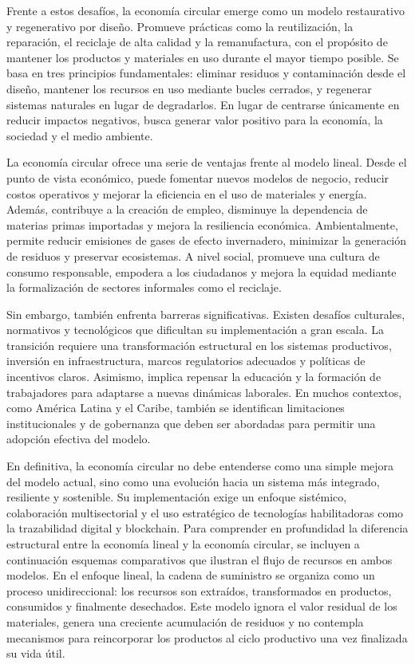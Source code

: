 Frente a estos desafíos, la economía circular emerge como un modelo restaurativo y regenerativo por diseño. Promueve prácticas como la reutilización, la reparación, el reciclaje de alta calidad y la remanufactura, con el propósito de mantener los productos y materiales en uso durante el mayor tiempo posible. Se basa en tres principios fundamentales: eliminar residuos y contaminación desde el diseño, mantener los recursos en uso mediante bucles cerrados, y regenerar sistemas naturales en lugar de degradarlos. En lugar de centrarse únicamente en reducir impactos negativos, busca generar valor positivo para la economía, la sociedad y el medio ambiente.

La economía circular ofrece una serie de ventajas frente al modelo lineal. Desde el punto de vista económico, puede fomentar nuevos modelos de negocio, reducir costos operativos y mejorar la eficiencia en el uso de materiales y energía. Además, contribuye a la creación de empleo, disminuye la dependencia de materias primas importadas y mejora la resiliencia económica. Ambientalmente, permite reducir emisiones de gases de efecto invernadero, minimizar la generación de residuos y preservar ecosistemas. A nivel social, promueve una cultura de consumo responsable, empodera a los ciudadanos y mejora la equidad mediante la formalización de sectores informales como el reciclaje.

Sin embargo, también enfrenta barreras significativas. Existen desafíos culturales, normativos y tecnológicos que dificultan su implementación a gran escala. La transición requiere una transformación estructural en los sistemas productivos, inversión en infraestructura, marcos regulatorios adecuados y políticas de incentivos claros. Asimismo, implica repensar la educación y la formación de trabajadores para adaptarse a nuevas dinámicas laborales. En muchos contextos, como América Latina y el Caribe, también se identifican limitaciones institucionales y de gobernanza que deben ser abordadas para permitir una adopción efectiva del modelo.

En definitiva, la economía circular no debe entenderse como una simple mejora del modelo actual, sino como una evolución hacia un sistema más integrado, resiliente y sostenible. Su implementación exige un enfoque sistémico, colaboración multisectorial y el uso estratégico de tecnologías habilitadoras como la trazabilidad digital y blockchain.
Para comprender en profundidad la diferencia estructural entre la economía lineal y la economía circular, se incluyen a continuación esquemas comparativos que ilustran el flujo de recursos en ambos modelos. En el enfoque lineal, la cadena de suministro se organiza como un proceso unidireccional: los recursos son extraídos, transformados en productos, consumidos y finalmente desechados. Este modelo ignora el valor residual de los materiales, genera una creciente acumulación de residuos y no contempla mecanismos para reincorporar los productos al ciclo productivo una vez finalizada su vida útil.

